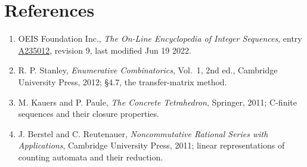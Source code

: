 \documentclass[11pt]{article}
\theoremstyle{definition}
\begin{document}
\section{References}

\begin{enumerate}

\item OEIS Foundation Inc., \emph{The On-Line Encyclopedia of Integer Sequences}, entry \href{https://oeis.org/A235012}{A235012}, revision 9, last modified Jun 19 2022.

\item R. P. Stanley, \emph{Enumerative Combinatorics}, Vol.~1, 2nd ed., Cambridge University Press, 2012; \S4.7, the transfer-matrix method.

\item M. Kauers and P. Paule, \emph{The Concrete Tetrahedron}, Springer, 2011; C-finite sequences and their closure properties.

\item J. Berstel and C. Reutenauer, \emph{Noncommutative Rational Series with Applications}, Cambridge University Press, 2011; linear representations of counting automata and their reduction.

\end{enumerate}
\end{document}
